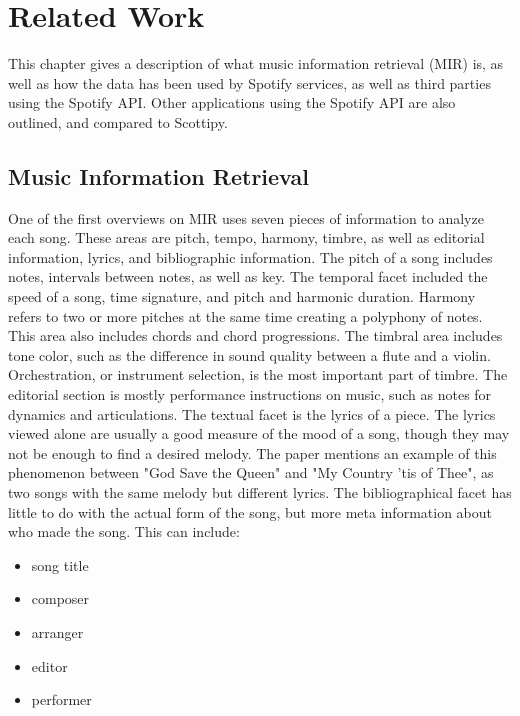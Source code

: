 %
%
\chapter{Related Work}\label{ch:music}

This chapter gives a description of what music information retrieval (MIR) is, as well as how
the data has been used by Spotify services, as well as third parties using the Spotify API.
Other applications using the Spotify API are also outlined, and compared to Scottipy.

\section{Music Information Retrieval}
One of the first overviews on MIR \cite{Downie:03} uses seven pieces of information
to analyze each song. These areas are pitch, tempo, harmony, timbre, as well as
editorial information, lyrics, and bibliographic information. The pitch of a song
includes notes, intervals between notes, as well as key. The temporal facet included
the speed of a song, time signature, and pitch and harmonic duration. Harmony refers
to two or more pitches at the same time creating a polyphony of notes. This area
also includes chords and chord progressions. The timbral area includes tone color,
such as the difference in sound quality between a flute and a violin. Orchestration,
or instrument selection, is the most important part of timbre. The editorial section
is mostly performance instructions on music, such as notes for dynamics and
articulations. The textual facet is the lyrics of a piece. The lyrics viewed alone
are usually a good measure of the mood of a song, though they may not be enough to
find a desired melody. The paper mentions an example of this phenomenon between
"God Save the Queen" and "My Country 'tis of Thee", as two songs with the same
melody but different lyrics. The bibliographical facet has little to do with the
actual form of the song, but more meta information about who made the song. This
can include:
\begin{itemize}
  \item song title
  \item composer
  \item arranger
  \item editor
  \item performer
\end{itemize}
